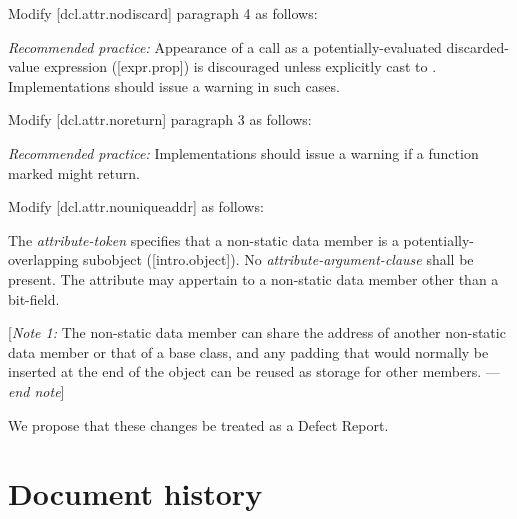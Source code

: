 Modify [dcl.attr.nodiscard] paragraph 4 as follows:

\begin{adjustwidth}{0.5cm}{0.5cm}
\emph{Recommended practice:} Appearance of a  call as a potentially-evaluated discarded-value expression ([expr.prop]) is discouraged unless explicitly cast to . Implementations should issue a warning in such cases. 
\end{adjustwidth}

Modify [dcl.attr.noreturn] paragraph 3 as follows:

\begin{adjustwidth}{0.5cm}{0.5cm}
\emph{Recommended practice:} Implementations should issue a warning if a function marked \tcode{[[noreturn]]} might return. 
\end{adjustwidth}

Modify [dcl.attr.nouniqueaddr] as follows:

\begin{adjustwidth}{0.5cm}{0.5cm}
The \emph{attribute-token}  specifies that a non-static data member is a potentially-overlapping subobject ([intro.object]). No \emph{attribute-argument-clause} shall be present. The attribute may appertain to a non-static data member other than a bit-field.

[\emph{Note 1:} The non-static data member can share the address of another non-static data member or that of a base class, and any padding that would normally be inserted at the end of the object can be reused as storage for other members. --- \emph{end note}]

\end{adjustwidth}

We propose that these changes be treated as a Defect Report.


\section*{Document history}

